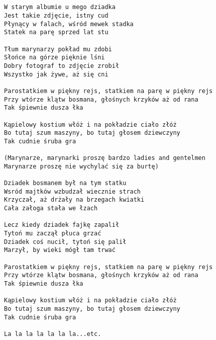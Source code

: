 \documentclass[12pt]{article}
\begin{document}
\subsection*{}
\begin{verbatim}
W starym albumie u mego dziadka
Jest takie zdjęcie, istny cud
Płynący w falach, wśród mewek stadka
Statek na parę sprzed lat stu

Tłum marynarzy pokład mu zdobi
Słońce na górze pięknie lśni
Dobry fotograf to zdjęcie zrobił
Wszystko jak żywe, aż się cni

Parostatkiem w piękny rejs, statkiem na parę w piękny rejs
Przy wtórze klątw bosmana, głośnych krzyków aż od rana
Tak śpiewnie dusza łka

Kąpielowy kostium włóż i na pokładzie ciało złóż
Bo tutaj szum maszyny, bo tutaj głosem dziewczyny
Tak cudnie śruba gra

(Marynarze, marynarki proszę bardzo ladies and gentelmen
Marynarze proszę nie wychylać się za burtę)

Dziadek bosmanem był na tym statku
Wsród majtków wzbudzał wiecznie strach
Krzyczał, aż drżały na brzegach kwiatki
Cała załoga stała we łzach

Lecz kiedy dziadek fajkę zapalił
Tytoń mu zaczął płuca grzać
Dziadek coś nucił, tytoń się palił
Marzył, by wieki mógł tam trwać

Parostatkiem w piękny rejs, statkiem na parę w piękny rejs
Przy wtórze klątw bosmana, głośnych krzyków aż od rana
Tak śpiewnie dusza łka

Kąpielowy kostium włóż i na pokładzie ciało złóż
Bo tutaj szum maszyny, bo tutaj głosem dziewczyny
Tak cudnie śruba gra

La la la la la la la...etc.
\end{verbatim}
\clearpage
\end{document}

